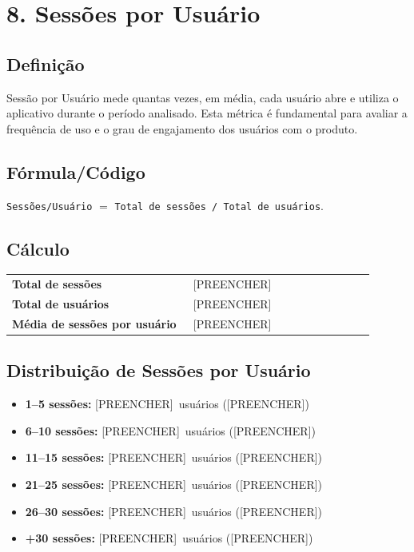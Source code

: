 \documentclass[12pt]{article}
\providecommand{\TotalSessoes}{[PREENCHER]}
\providecommand{\TotalUsuarios}{[PREENCHER]}
\providecommand{\SessoesPorUsuario}{[PREENCHER]}
\providecommand{\SessUmACinco}{[PREENCHER]}\providecommand{\SessUmACincoPct}{[PREENCHER]}
\providecommand{\SessSeisADez}{[PREENCHER]}\providecommand{\SessSeisADezPct}{[PREENCHER]}
\providecommand{\SessOnzeAQuinze}{[PREENCHER]}\providecommand{\SessOnzeAQuinzePct}{[PREENCHER]}
\providecommand{\SessVinteEUmAVinteECinco}{[PREENCHER]}\providecommand{\SessVinteEUmAVinteECincoPct}{[PREENCHER]}
\providecommand{\SessVinteESeisATrinta}{[PREENCHER]}\providecommand{\SessVinteESeisATrintaPct}{[PREENCHER]}
\providecommand{\SessMaisDeTrinta}{[PREENCHER]}\providecommand{\SessMaisDeTrintaPct}{[PREENCHER]}
\begin{document}
\section*{8. Sessões por Usuário}
\subsection*{Definição}
Sessão por Usuário mede quantas vezes, em média, cada usuário abre e utiliza o aplicativo durante o período analisado. Esta métrica é fundamental para avaliar a frequência de uso e o grau de engajamento dos usuários com o produto.

\subsection*{Fórmula/Código}
\noindent \texttt{Sessões/Usuário} $=$ \texttt{Total de sessões / Total de usuários}.

\subsection*{Cálculo}
\begin{center}
\begin{tabular}{>{\bfseries}p{0.45\linewidth} p{0.45\linewidth}}
\toprule
Total de sessões & \TotalSessoes \\
Total de usuários & \TotalUsuarios \\
Média de sessões por usuário & \SessoesPorUsuario \\
\bottomrule
\end{tabular}
\end{center}

\subsection*{Distribuição de Sessões por Usuário}
\begin{itemize}
  \item \textbf{1--5 sessões:} \SessUmACinco\ usuários (\SessUmACincoPct)
  \item \textbf{6--10 sessões:} \SessSeisADez\ usuários (\SessSeisADezPct)
  \item \textbf{11--15 sessões:} \SessOnzeAQuinze\ usuários (\SessOnzeAQuinzePct)
  \item \textbf{21--25 sessões:} \SessVinteEUmAVinteECinco\ usuários (\SessVinteEUmAVinteECincoPct)
  \item \textbf{26--30 sessões:} \SessVinteESeisATrinta\ usuários (\SessVinteESeisATrintaPct)
  \item \textbf{+30 sessões:} \SessMaisDeTrinta\ usuários (\SessMaisDeTrintaPct)
\end{itemize}
\end{document}
